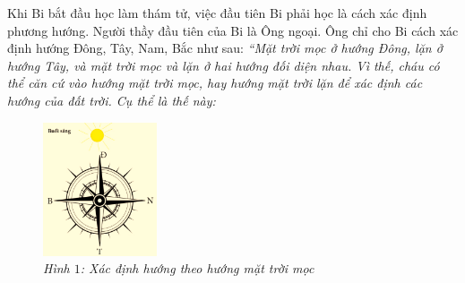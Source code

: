 \newpage
\graphicspath{{../timhieucungbi/hoclamthamtu/}}
\begingroup
{} %
\centering
\endgroup
\vspace*{25pt}
	Khi Bi bắt đầu học làm thám tử, việc đầu tiên Bi phải học là cách xác định phương hướng. Người thầy đầu tiên của Bi là Ông ngoại. Ông chỉ cho Bi cách xác định hướng Đông, Tây, Nam, Bắc như sau:
	\vskip 0.1cm
	\textit{“Mặt trời mọc ở hướng Đông, lặn ở hướng Tây, và mặt trời mọc và lặn ở hai hướng đối diện nhau. Vì thế, cháu có thể căn cứ vào hướng mặt trời mọc, hay hướng mặt trời lặn để xác định các hướng của đất trời. Cụ thể là thế này:}
	\vskip 0.1cm
	\begin{figure}
		\centering
		\vspace*{-15pt}
		\captionsetup{labelformat= empty, justification=centering}
		\includegraphics[width=0.3\textwidth]{pic1}
		\caption{\small\textit{Hình $1$: Xác định hướng theo hướng mặt trời mọc}}
		\vspace*{-10pt}
	\end{figure}
